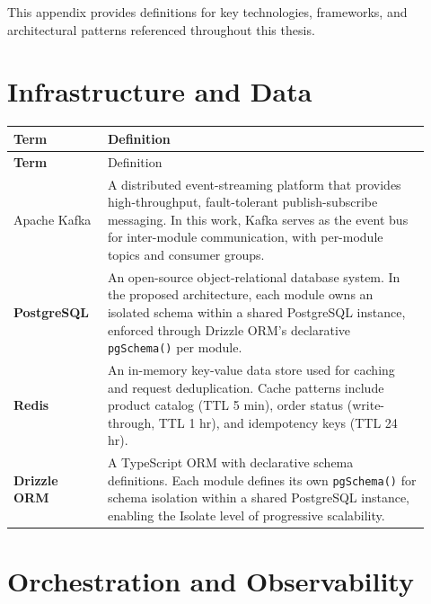 This appendix provides definitions for key technologies, frameworks, and architectural patterns referenced throughout this thesis.

\section{Infrastructure and Data}

\begin{longtable}{>{\bfseries}p{0.20\linewidth} p{0.72\linewidth}}
\toprule
Term & Definition \\
\midrule
\endfirsthead
\toprule
Term & Definition \\
\midrule
\endhead
\bottomrule
\endfoot

Apache Kafka &
A distributed event-streaming platform that provides high-throughput, fault-tolerant publish-subscribe messaging. In this work, Kafka serves as the event bus for inter-module communication, with per-module topics and consumer groups. \\

PostgreSQL &
An open-source object-relational database system. In the proposed architecture, each module owns an isolated schema within a shared PostgreSQL instance, enforced through Drizzle ORM's declarative \texttt{pgSchema()} per module. \\

Redis &
An in-memory key-value data store used for caching and request deduplication. Cache patterns include product catalog (TTL 5 min), order status (write-through, TTL 1 hr), and idempotency keys (TTL 24 hr). \\

Drizzle ORM &
A TypeScript ORM with declarative schema definitions. Each module defines its own \texttt{pgSchema()} for schema isolation within a shared PostgreSQL instance, enabling the Isolate level of progressive scalability. \\

\end{longtable}

\section{Orchestration and Observability}

